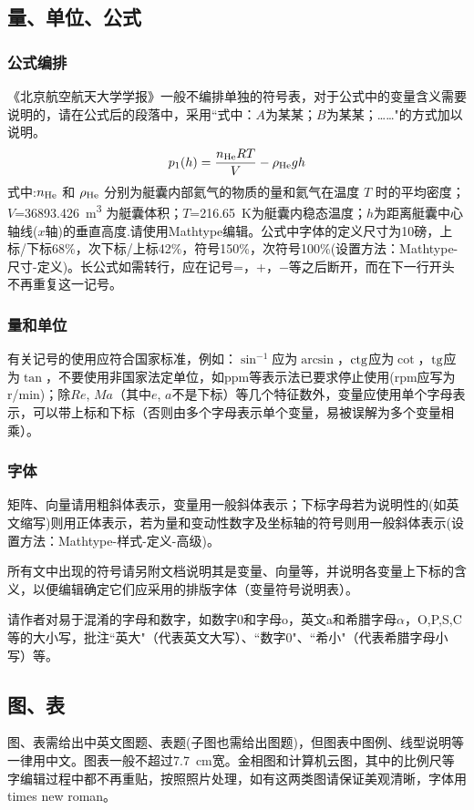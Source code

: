 \documentclass[10.5pt,twocolumn]{jbuaa}
\begin{document}
\subsection{量、单位、公式}
\subsubsection{公式编排}
\label{labSecForm}
《北京航空航天大学学报》一般不编排单独的符号表，对于公式中的变量含义需要说明的，请在公式后的段落中，采用``式中：$A$为某某；$B$为某某；……"的方式加以说明。
\begin{equation}
\label{eqnLabelp}
p_1 (h) = \dfrac{n_{\textnormal{He}}RT}{V}-\rho_{\textnormal{He}}gh
\end{equation}
式中:$n_{\textnormal{He}}$ 和 $\rho_{\textnormal{He}}$ 分别为艇囊内部氦气的物质的量和氦气在温度 $T$ 时的平均密度；
$V$=\SI{36893.426}{\cubic\meter}%
为艇囊体积；$T$=\SI{216.65}{\kelvin}为艇囊内稳态温度；$h$为距离艇囊中心轴线($x$轴)的垂直高度.请使用Mathtype编辑。公式中字体的定义尺寸为10磅，上标/下标68\%，次下标/上标42\%，符号150\%，次符号100\%(设置方法：Mathtype-尺寸-定义)。长公式如需转行，应在记号=，+，$-$等之后断开，而在下一行开头不再重复这一记号。

\subsubsection{量和单位}
有关记号的使用应符合国家标准，例如：$\sin^{-1}$应为$\arcsin$，$\rm ctg$应为$\cot$，$\rm tg$应为$\tan$，不要使用非国家法定单位，如ppm等表示法已要求停止使用(rpm应写为r/min)；除$Re$, $Ma$（其中$e$, $a$不是下标）等几个特征数外，变量应使用单个字母表示，可以带上标和下标（否则由多个字母表示单个变量，易被误解为多个变量相乘）。

\subsubsection{字体}
矩阵、向量请用粗斜体表示，变量用一般斜体表示；下标字母若为说明性的(如英文缩写)则用正体表示，若为量和变动性数字及坐标轴的符号则用一般斜体表示(设置方法：Mathtype-样式-定义-高级)。

所有文中出现的符号请另附文档说明其是变量、向量等，并说明各变量上下标的含义，以便编辑确定它们应采用的排版字体（变量符号说明表）。

请作者对易于混淆的字母和数字，如数字0和字母o，英文a和希腊字母$\alpha$，O,P,S,C等的大小写，批注``英大"（代表英文大写）、``数字0"、``希小"（代表希腊字母小写）等。

\subsection{图、表}
图、表需给出中英文图题、表题(子图也需给出图题)，但图表中图例、线型说明等一律用中文。图表一般不超过7.7\ cm宽。金相图和计算机云图，其中的比例尺等字编辑过程中都不再重贴，按照照片处理，如有这两类图请保证美观清晰，字体用times new roman。
\end{document}
